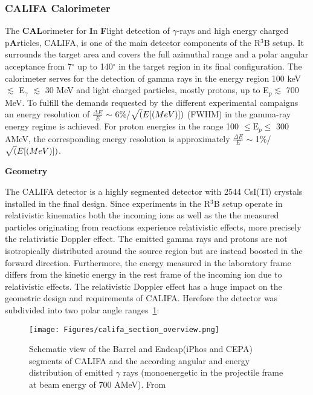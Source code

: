 \subsubsection{CALIFA Calorimeter}\label{sec:califa}
The \textbf{CAL}orimeter for \textbf{I}n \textbf{F}light detection of $\gamma$-rays and high energy charged p\textbf{A}rticles, CALIFA, is one of the main detector components of the R$^3$B setup. It surrounds the target area and covers the full azimuthal range and a polar angular acceptance from 7$^{\circ}$ up to 140$^{\circ}$ in the target region in its final configuration. The calorimeter serves for the detection of gamma rays in the energy region 100 keV $\lesssim$ E$_{\gamma}$ $\lesssim$ 30 MeV and light charged particles, mostly protons, up to E$_p \lesssim$ 700 MeV. To fulfill the demands requested by the different experimental campaigns an energy resolution of $\frac{\Delta E}{E}$ $\sim$ 6\%/$\sqrt(E[\text(MeV)])$ (FWHM) in the gamma-ray energy regime is achieved. For proton energies in the range 100 $\leq \text{E}_p \leq$ 300 AMeV, the corresponding energy resolution is approximately $\frac{\Delta E}{E}$ $\sim$ 1\%/$\sqrt(E[\text(MeV)])$.\newline

\textbf{Geometry}\newline

The CALIFA detector is a highly segmented detector with 2544 CsI(Tl) crystals installed in the final design. Since experiments in the R$^3$B setup operate in relativistic kinematics both the incoming ions as well as the the measured particles originating from reactions experience relativistic effects, more precisely the relativistic Doppler effect. The emitted gamma rays and protons are not isotropically distributed around the source region but are instead boosted in the forward direction. Furthermore, the energy measured in the laboratory frame differs from the kinetic energy in the rest frame of the incoming ion due to relativistic effects.\newline
The relativistic Doppler effect has a huge impact on the geometric design and requirements of CALIFA. Herefore the detector was subdivided into two polar angle ranges~\ref{fig:califa_sec}:
\begin{figure}[htpb]
    \centering
    \texttt{[image: Figures/califa\_section\_overview.png]}
    \caption{
    Schematic view of the Barrel and Endcap(iPhos and CEPA) segments of CALIFA and the according angular and energy distribution of emitted $\gamma$ rays (monoenergetic in the projectile frame at beam energy of 700 AMeV). From \cite{tdr:barrel}
    }
    \label{fig:califa_sec}
\end{figure}


